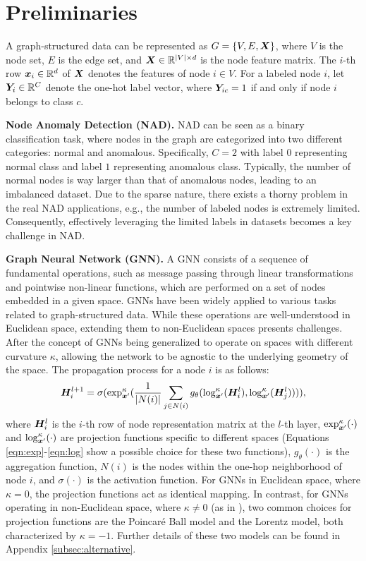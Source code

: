 \section{Preliminaries}
\label{sec:preliminaries}

A graph-structured data can be represented as $G=\{V, E, \boldsymbol{X}\}$, where $V$ is the node set, $E$ is the edge set, and $\boldsymbol{X}\in \mathbb{R}^{|V|\times d}$ is the node feature matrix. The $i$-th row $\boldsymbol{x}_i\in \mathbb{R}^d$ of $\boldsymbol{X}$ denotes the features of node $i \in V$. For a labeled node $i$, let $\boldsymbol{Y}_i\in \mathbb{R}^C$ denote the one-hot label vector, where $\boldsymbol{Y}_{ic}=1$ if and only if node $i$ belongs to class $c$. 

{\bf Node Anomaly Detection (NAD).} NAD can be seen as a binary classification task, where nodes in the graph are categorized into two different categories: normal and anomalous. Specifically, $C=2$ with label $0$ representing normal class and label $1$ representing anomalous class. Typically, the number of normal nodes is way larger than that of anomalous nodes, leading to an imbalanced dataset. Due to the sparse nature, there exists a thorny problem in the real NAD applications, e.g., the number of labeled nodes is extremely limited. Consequently, effectively leveraging the limited labels in datasets becomes a key challenge in NAD. 

{\bf Graph Neural Network (GNN).} A GNN consists of a sequence of fundamental operations, such as message passing through linear transformations and pointwise non-linear functions, which are performed on a set of nodes embedded in a given space. GNNs have been widely applied to various tasks related to graph-structured data. While these operations are well-understood in Euclidean space, extending them to non-Euclidean spaces presents challenges. After the concept of GNNs being generalized to operate on spaces with different curvature $\kappa$, allowing the network to be agnostic to the underlying geometry of the space. The propagation process for a node $i$ is as follows:
\begin{equation*}
    \boldsymbol{H}_i^{l+1}=\sigma(\exp^\kappa_{\boldsymbol{x}'}(\frac{1}{|N(i)|}\sum_{j\in N(i)}g_\theta(\log^\kappa_{\boldsymbol{x}'}(\boldsymbol{H}_i^l), \log^\kappa_{\boldsymbol{x}'}(\boldsymbol{H}_j^l)))), 
\end{equation*}
where $\boldsymbol{H}_i^{l}$ is the $i$-th row of node representation matrix at the $l$-th layer, $\exp^\kappa_{\boldsymbol{x}'}(\cdot)$ and $\log^\kappa_{\boldsymbol{x}'}(\cdot)$ are projection functions specific to different spaces (Equations \ref{eqn:exp}-\ref{eqn:log} show a possible choice for these two functions), $g_\theta(\cdot)$ is the aggregation function, $N(i)$ is the nodes within the one-hop neighborhood of node $i$, and $\sigma(\cdot)$ is the activation function. For GNNs in Euclidean space, where $\kappa=0$, the projection functions act as identical mapping. 
In contrast, for GNNs operating in non-Euclidean space, where $\kappa \neq 0$ (as in \citep{hgcn19chami}), two common choices for projection functions are the Poincaré Ball model and the Lorentz model, both characterized by $\kappa =-1$. Further details of these two models can be found in Appendix \ref{subsec:alternative}. 


